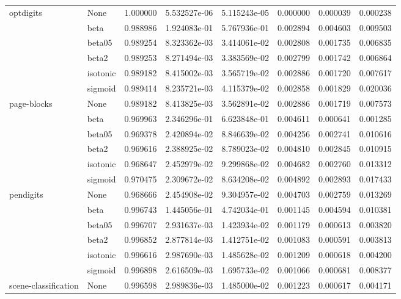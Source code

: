 \begin{tabular}{llrrrrrr}
optdigits & None &  1.000000 &  5.532527e-06 &  5.115243e-05 &  0.000000 &  0.000039 &  0.000238 \\
        & beta &  0.988986 &  1.924083e-01 &  5.767936e-01 &  0.002894 &  0.004603 &  0.009503 \\
        & beta05 &  0.989254 &  8.323362e-03 &  3.414061e-02 &  0.002808 &  0.001735 &  0.006835 \\
        & beta2 &  0.989253 &  8.271494e-03 &  3.383569e-02 &  0.002799 &  0.001742 &  0.006864 \\
        & isotonic &  0.989182 &  8.415002e-03 &  3.565719e-02 &  0.002886 &  0.001720 &  0.007617 \\
        & sigmoid &  0.989414 &  8.235721e-03 &  4.115379e-02 &  0.002858 &  0.001829 &  0.020036 \\
page-blocks & None &  0.989182 &  8.413825e-03 &  3.562891e-02 &  0.002886 &  0.001719 &  0.007573 \\
        & beta &  0.969963 &  2.346296e-01 &  6.623848e-01 &  0.004611 &  0.000641 &  0.001285 \\
        & beta05 &  0.969378 &  2.420894e-02 &  8.846639e-02 &  0.004256 &  0.002741 &  0.010616 \\
        & beta2 &  0.969616 &  2.388925e-02 &  8.789023e-02 &  0.004810 &  0.002845 &  0.010915 \\
        & isotonic &  0.968647 &  2.452979e-02 &  9.299868e-02 &  0.004682 &  0.002760 &  0.013312 \\
        & sigmoid &  0.970475 &  2.309672e-02 &  8.634208e-02 &  0.004892 &  0.002893 &  0.017433 \\
pendigits & None &  0.968666 &  2.454908e-02 &  9.304957e-02 &  0.004703 &  0.002759 &  0.013269 \\
        & beta &  0.996743 &  1.445056e-01 &  4.742034e-01 &  0.001145 &  0.004594 &  0.010381 \\
        & beta05 &  0.996707 &  2.931637e-03 &  1.423934e-02 &  0.001179 &  0.000613 &  0.003820 \\
        & beta2 &  0.996852 &  2.877814e-03 &  1.412751e-02 &  0.001083 &  0.000591 &  0.003813 \\
        & isotonic &  0.996616 &  2.987690e-03 &  1.485628e-02 &  0.001209 &  0.000618 &  0.004200 \\
        & sigmoid &  0.996898 &  2.616509e-03 &  1.695733e-02 &  0.001066 &  0.000681 &  0.008377 \\
scene-classification & None &  0.996598 &  2.989836e-03 &  1.485000e-02 &  0.001223 &  0.000617 &  0.004171 \\

\end{tabular}
